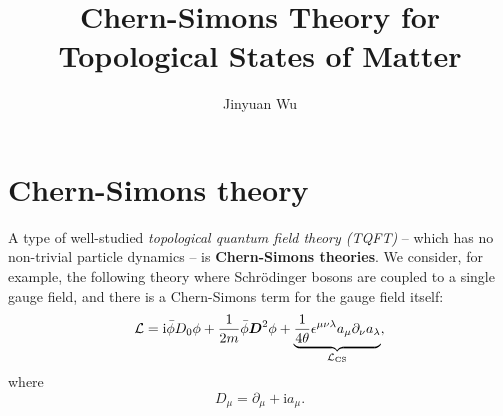 \documentclass[hyperref, a4paper]{article}
\title{Chern-Simons Theory for Topological States of Matter}
\author{Jinyuan Wu}
\newcommand*{\ii}{\mathrm{i}}
\newcommand*{\concept}[1]{{\textbf{#1}}}
\begin{document}
\maketitle

\section{Chern-Simons theory}\label{sec:simple-cs}

A type of well-studied \emph{topological quantum field theory (TQFT)} -- which has no non-trivial particle dynamics -- is \concept{Chern-Simons theories}.
We consider, for example, the following theory where Schrödinger bosons are coupled to a single gauge field,
and there is a Chern-Simons term for the gauge field itself:
\begin{equation}
    \mathcal{L}= \ii \bar{\phi} D_{0} \phi+\frac{1}{2 m} \bar{\phi} \vb*{D}^{2} \phi
    +\underbrace{\frac{1}{4 \theta} \epsilon^{\mu \nu \lambda} a_{\mu} \partial_{\nu} a_{\lambda}}_{\mathcal{L}_\text{CS}},
    \label{eq:simplest-cs-theory}
\end{equation} 
where 
\begin{equation}
    D_{\mu}=\partial_{\mu}+ \ii a_{\mu}.
\end{equation}
\end{document}
